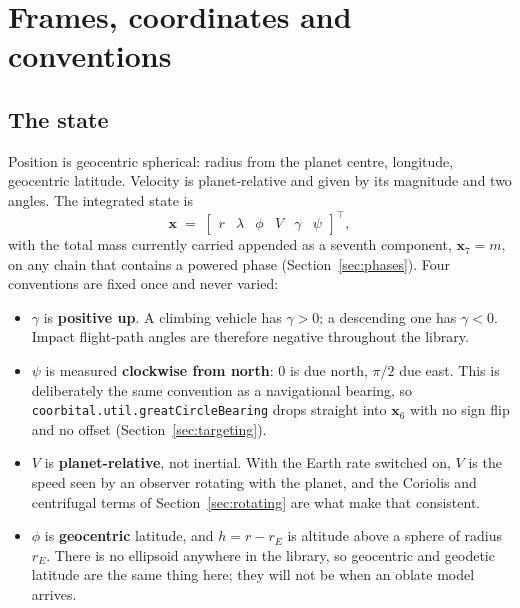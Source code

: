 \documentclass[11pt]{article}
\newcommand{\code}[1]{\texttt{#1}}
\begin{document}
\section{Frames, coordinates and conventions}
\label{sec:frames}

\subsection{The state}

Position is geocentric spherical: radius from the planet centre, longitude,
geocentric latitude. Velocity is planet-relative and given by its magnitude and
two angles. The integrated state is
\begin{equation}
  \mathbf{x} \;=\; \begin{bmatrix} r & \lambda & \phi & V & \gamma & \psi
  \end{bmatrix}^{\!\top},
  \label{eq:state}
\end{equation}
with the total mass currently carried appended as a seventh component,
$\mathbf{x}_7 = m$, on any chain that contains a powered phase
(Section~\ref{sec:phases}). Four conventions are fixed once and never varied:

\begin{itemize}
\item $\gamma$ is \textbf{positive up}. A climbing vehicle has
$\gamma>0$; a descending one has $\gamma<0$. Impact flight-path angles are
therefore negative throughout the library.
\item $\psi$ is measured \textbf{clockwise from north}: $0$ is due north,
$\pi/2$ due east. This is deliberately the same convention as a navigational
bearing, so \code{coorbital.util.greatCircleBearing} drops straight into
$\mathbf{x}_6$ with no sign flip and no offset
(Section~\ref{sec:targeting}).
\item $V$ is \textbf{planet-relative}, not inertial. With the Earth rate
switched on, $V$ is the speed seen by an observer rotating with the planet, and
the Coriolis and centrifugal terms of Section~\ref{sec:rotating} are what make
that consistent.
\item $\phi$ is \textbf{geocentric} latitude, and $h = r - r_E$ is altitude
above a sphere of radius $r_E$. There is no ellipsoid anywhere in the library,
so geocentric and geodetic latitude are the same thing here; they will not be
when an oblate model arrives.
\end{itemize}
\end{document}
